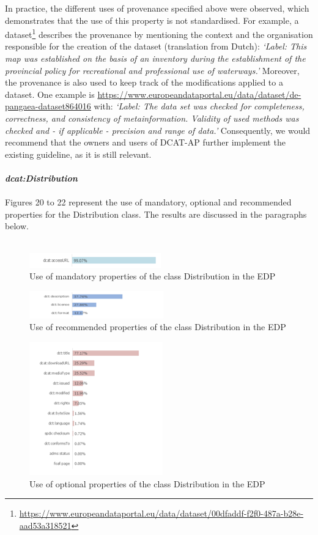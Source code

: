 \documentclass[<options>]{elsarticle}
\begin{document}
In practice, the different uses of provenance specified above were observed, which demonstrates that the use of this property is not standardised. For example, a dataset\footnote{\href{  https://www.europeandataportal.eu/data/dataset/00dfaddf-f2f0-487a-b28e-aad53a318521}{https://www.europeandataportal.eu/data/dataset/00dfaddf-f2f0-487a-b28e-aad53a318521}} describes the provenance by mentioning the context and the organisation responsible for the creation of the dataset (translation from Dutch): \textit{‘Label: This map was established on the basis of an inventory during the establishment of the provincial policy for recreational and professional use of waterways.’}
Moreover, the provenance is also used to keep track of the modifications applied to a dataset. One example is \url{https://www.europeandataportal.eu/data/dataset/de-pangaea-dataset864016} with: \textit{‘Label: The data set was checked for completeness, correctness, and consistency of metainformation. Validity of used methods was checked and - if applicable - precision and range of data.’} Consequently, we would recommend that the owners and users of DCAT-AP further implement the existing guideline, as it is still relevant.
\\
\\
\textbf{\textit{dcat:Distribution}}\\
\\
Figures 20 to 22 represent the use of mandatory, optional and recommended properties for the Distribution class. The results are discussed in the paragraphs below.
\\
\\
\begin{figure}[!h]
\includegraphics{replace23.png}
\caption{Use of mandatory properties of the class Distribution in the EDP}
\end{figure}
\begin{figure}[!h]
\includegraphics{replace24.png}
\caption{Use of recommended properties of the class Distribution in the EDP}
\end{figure}
\begin{figure}[!h]
\includegraphics{replace25.png}
\caption{Use of optional properties of the class Distribution in the EDP}
\end{figure}
\end{document}

